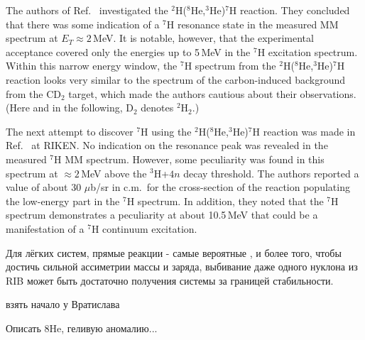 The authors of Ref.\ \cite{Fortier:2007} investigated the $^2$H($^8$He,$^3$He)$^7$H reaction.
They concluded that there was some indication of a $^7$H resonance state in the measured MM spectrum at $E_T \approx 2$\,MeV.
It is notable, however, that the experimental acceptance covered only the energies up to 5\,MeV in the $^{7}$H excitation spectrum.
Within this narrow energy window, the $^{7}$H spectrum from the $^2$H($^8$He,$^3$He)$^7$H reaction looks very similar to the spectrum of the  carbon-induced background from the CD$_2$ target, which made the authors cautious about their observations. (Here and in the following, D$_2$ denotes
$^2$H$_2$.)

The next attempt to discover $^{7}$H  using the $^2$H($^8$He,$^3$He)$^7$H reaction was made in Ref.\ \cite{Nikolskii:2010} at RIKEN.
No indication on the resonance peak was revealed in the measured $^7$H MM spectrum.
However, some peculiarity was found in this spectrum at $\approx 2$\,MeV above the $^3$H+$4n$ decay threshold.
The authors reported a value of about 30 $\mu$b/sr in c.m.\ for the cross-section of the reaction populating the low-energy part in the $^7$H spectrum.
In addition, they noted that the $^7$H spectrum demonstrates a peculiarity at about 10.5\,MeV that could be a manifestation of a $^{7}$H continuum excitation.

Для лёгких систем, прямые реакции - самые вероятные , и более того, чтобы достичь сильной ассиметрии массы и заряда, выбивание даже одного нуклона из RIB может быть достаточно получения системы за границей стабильности.

взять начало у Вратислава

Описать 8He, геливую аномалию...